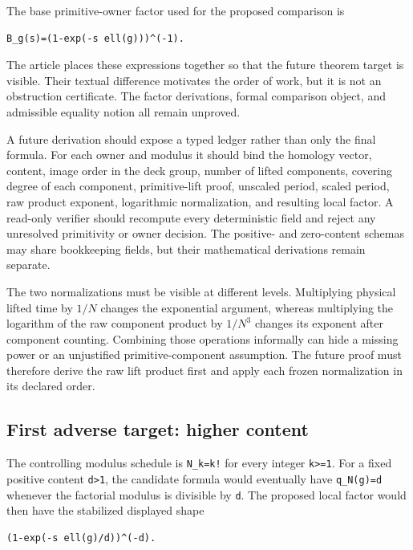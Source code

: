 \documentclass[11pt]{article}
\begin{document}
The base primitive-owner factor used for the proposed comparison is

\begin{verbatim}
B_g(s)=(1-exp(-s ell(g)))^(-1).
\end{verbatim}

The article places these expressions together so that the future theorem
target is visible. Their textual difference motivates the order of work,
but it is not an obstruction certificate. The factor derivations, formal
comparison object, and admissible equality notion all remain unproved.

A future derivation should expose a typed ledger rather than only the
final formula. For each owner and modulus it should bind the homology
vector, content, image order in the deck group, number of lifted
components, covering degree of each component, primitive-lift proof,
unscaled period, scaled period, raw product exponent, logarithmic
normalization, and resulting local factor. A read-only verifier should
recompute every deterministic field and reject any unresolved
primitivity or owner decision. The positive- and zero-content schemas
may share bookkeeping fields, but their mathematical derivations remain
separate.

The two normalizations must be visible at different levels. Multiplying
physical lifted time by $1/N$ changes the exponential argument, whereas
multiplying the logarithm of the raw component product by $1/N^3$
changes its exponent after component counting. Combining those
operations informally can hide a missing power or an unjustified
primitive-component assumption. The future proof must therefore derive
the raw lift product first and apply each frozen normalization in its
declared order.

\hypertarget{42-first-adverse-target-higher-content}{%
\subsection{First adverse target: higher
content}\label{42-first-adverse-target-higher-content}}

The controlling modulus schedule is \texttt{N\_k=k!} for every integer
\texttt{k\textgreater{}=1}. For a fixed positive content
\texttt{d\textgreater{}1}, the candidate formula would eventually have
\texttt{q\_N(g)=d} whenever the factorial modulus is divisible by
\texttt{d}. The proposed local factor would then have the stabilized
displayed shape

\begin{verbatim}
(1-exp(-s ell(g)/d))^(-d).
\end{verbatim}
\end{document}
